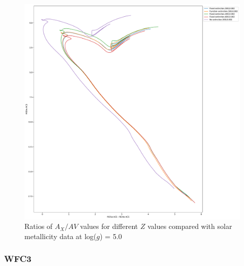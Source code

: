 \documentclass[a4paper, 11pt, oneside]{LJMU_Astro_Thesis}  %
\begin{document}
\begin{figure}[h]
\begin{center}
\includegraphics[scale=0.3]{../basti_isochrones_10_13Gyr/Extinction_T50k_FeH0fix_func_f435wACS_f435wACSmf814wACS_500_400_600_Myr_FeH_0p002_ref_noext_Av_1p0.pdf}
\caption{Ratios of $A_{X}/A{V}$ values for different $Z$ values compared with solar metallicity data at log($g$) = 5.0}
\label{acs_isoc_T50k}
\end{center}
\end{figure}

\subsubsection{WFC3} \label{WFC3_isoc}
\end{document}
